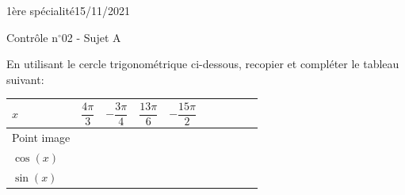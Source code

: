 \documentclass[a4paper,12pt]{article}        %
\begin{document}
\pagestyle{empty}
\vspace*{-1.5cm}
1ère spécialité\phantom{xxxxxxxxxxxxxxxxxxxxxxxxxxxxxxxxxxxxxxxxxxxxxxxxxxxxxxxxxxxxxxx}15/11/2021
{\begin{center}\Huge{Contrôle n$^{\circ}$02 - Sujet A}\end{center}}


En utilisant le cercle trigonométrique ci-dessous, recopier et compléter le tableau suivant:\\
\begin{center}
\begin{tabular}{ | Xc | Xc | Xc | Xc | Xc |}
    \hline
    $x$  & $\dfrac{4\pi}{3}$ & $-\dfrac{3\pi}{4}$ & $\dfrac{13\pi}{6}$ &  $-\dfrac{15\pi}{2}$ \\ \hline
    Point image  &   &   &   &   \\ \hline
    $\cos(x)$  &   &   &   &   \\ \hline
    $\sin(x)$ &   &   &   &   \\
    \hline  
\end{tabular}
\end{center}
\end{document}
